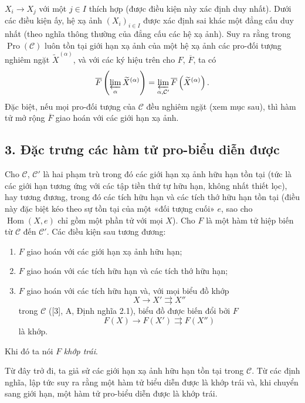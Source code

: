 \documentclass[11pt,twoside,openany]{book}
\numberwithin{equation}{section}
\newcommand{\src}[1]{%
  \phantomsection\hypertarget{src:\fgasourceid:#1}{}%
  \marginpar{\raggedleft\footnotesize\sffamily #1}%
}
\newcommand{\fgasourceid}{unset}
\begin{document}
\src{373}
$X_i\longrightarrow X_j$ với một $j\in I$ thích hợp (được điều kiện này xác
định duy nhất). Dưới các điều kiện ấy, hệ xạ ảnh $(X_i)_{i\in I}$ được xác
định sai khác một đẳng cấu duy nhất (theo nghĩa thông thường của đẳng cấu các
hệ xạ ảnh). Suy ra rằng trong $\operatorname{Pro}(\mathcal C)$ luôn tồn tại
giới hạn xạ ảnh của một hệ xạ ảnh các pro-đối tượng nghiêm ngặt
$\widetilde X^{(\alpha)}$, và với các ký hiệu trên cho $F$, $\overline F$, ta
có
\[
  \overline F\left(\varprojlim_\alpha\widetilde X^{(\alpha)}\right)
  =\varprojlim_{\alpha,\mathcal C'}
  \overline F\left(\widetilde X^{(\alpha)}\right).
\]
Đặc biệt, nếu mọi pro-đối tượng của $\mathcal C$ đều nghiêm ngặt (xem mục
sau), thì hàm tử mở rộng $\overline F$ giao hoán với các giới hạn xạ ảnh.

\subsection*{3. Đặc trưng các hàm tử pro-biểu diễn được}

Cho $\mathcal C$, $\mathcal C'$ là hai phạm trù trong đó các giới hạn xạ ảnh
hữu hạn tồn tại (tức là các giới hạn tương ứng với các tập tiền thứ tự hữu
hạn, không nhất thiết lọc), hay tương đương, trong đó các tích hữu hạn và các
tích thớ hữu hạn tồn tại (điều này đặc biệt kéo theo sự tồn tại của một «đối
tượng cuối» $e$, sao cho $\operatorname{Hom}(X,e)$ chỉ gồm một phần tử với
mọi $X$). Cho $F$ là một hàm tử hiệp biến từ $\mathcal C$ đến
$\mathcal C'$. Các điều kiện sau tương đương:

\begin{enumerate}
\item[(i)] $F$ giao hoán với các giới hạn xạ ảnh hữu hạn;
\item[(ii)] $F$ giao hoán với các tích hữu hạn và các tích thớ hữu hạn;
\item[(iii)] $F$ giao hoán với các tích hữu hạn và, với mọi biểu đồ khớp
\[
  X\longrightarrow X'\rightrightarrows X''
\]
trong $\mathcal C$ ([3], A, Định nghĩa 2.1), biểu đồ được biến đổi bởi $F$
\[
  F(X)\longrightarrow F(X')\rightrightarrows F(X'')
\]
là khớp.
\end{enumerate}

Khi đó ta nói $F$ \emph{khớp trái}.

Từ đây trở đi, ta giả sử các giới hạn xạ ảnh hữu hạn tồn tại trong
$\mathcal C$. Từ các định nghĩa, lập tức suy ra rằng một hàm tử biểu diễn
được là khớp trái và, khi chuyển sang giới hạn, một hàm tử pro-biểu diễn được
là khớp trái.
\end{document}
